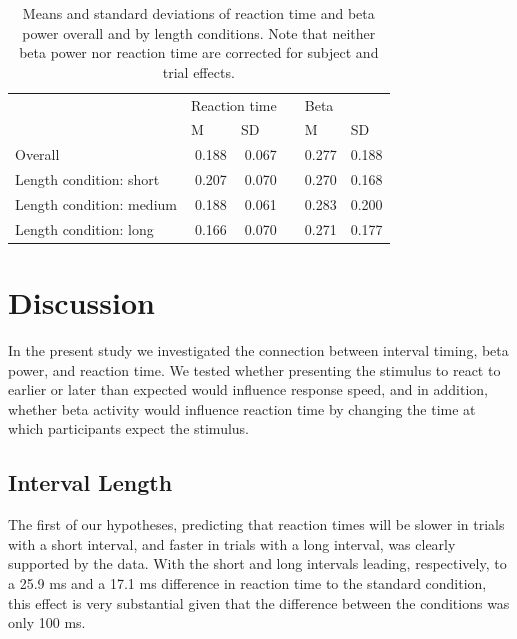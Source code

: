 \documentclass[man,floatsintext]{apa6} %
\begin{document}
\begin{table}[!h]
  \caption{Means and standard deviations of reaction time and beta power overall and by length conditions. Note that neither beta power nor reaction time are corrected for subject and trial effects.}
  \begin{flushleft}
    \begin{tabular}{lrrrrr}
      \toprule
                               & \multicolumn{2}{l}{Reaction time}              && \multicolumn{2}{l}{Beta}                       \\ \cmidrule{2-3} \cmidrule{5-6}
                               & \multicolumn{1}{l}{M} & \multicolumn{1}{l}{SD} && \multicolumn{1}{l}{M} & \multicolumn{1}{l}{SD} \\
      \midrule
      Overall                  & 0.188                 &  0.067                 && 0.277                 & 0.188                  \\
      Length condition: short  & 0.207                 &  0.070                 && 0.270                 & 0.168                  \\
      Length condition: medium & 0.188                 &  0.061                 && 0.283                 & 0.200                  \\
      Length condition: long   & 0.166                 &  0.070                 && 0.271                 & 0.177                  \\
      \bottomrule
    \end{tabular}
  \end{flushleft}
  \label{tbl:descriptives}
\end{table}


\section{Discussion}
In the present study we investigated the connection between interval
timing, beta power, and reaction time. We tested whether presenting
the stimulus to react to earlier or later than expected would
influence response speed, and in addition, whether beta activity would
influence reaction time by changing the time at which participants
expect the stimulus.

\subsection{Interval Length}
The first of our hypotheses, predicting that reaction times will be
slower in trials with a short interval, and faster in trials with a
long interval, was clearly supported by the data.  With the short and
long intervals leading, respectively, to a 25.9 ms and a 17.1 ms
difference in reaction time to the standard condition, this effect is
very substantial given that the difference between the conditions was
only 100 ms.
\end{document}
